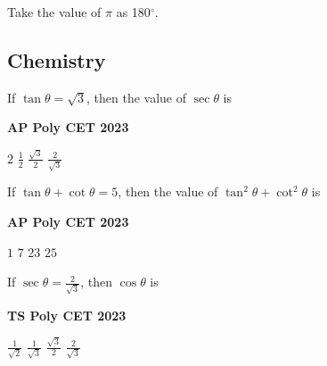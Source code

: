 \documentclass[11pt,paper=a4,answers]{exam}
\begin{document}
\begin{center}
\Large{Take the value of $\pi$ as 180${^\circ}$.}
\end{center}

\newpage















\subsection*{Chemistry}
\begin{multicols}{2}
\begin{questions}
\question
If $\tan  \theta = \sqrt{3}$, then the value of $\sec \theta$ is
\begin{flushright}
\small\textbf{AP Poly CET 2023}
\end{flushright}


\begin{choices}
\choice $\displaystyle 2$ 
\choice $\displaystyle \frac{1}{2}$ 
\choice $\displaystyle \frac{\sqrt{3}}{2}$ 
\choice $\displaystyle \frac{2}{\sqrt{3}}$  
\end{choices}






\question If $\tan  \theta + \cot \theta = 5$, then the value of $\tan^2  \theta + \cot^2 \theta $ is
\begin{flushright}
\small\textbf{AP Poly CET 2023}
\end{flushright}

\begin{choices}
\choice $\displaystyle 1$ 
\choice $\displaystyle 7$ 
\choice $\displaystyle 23$ 
\choice $\displaystyle 25$  
\end{choices}
\question If $\displaystyle \sec  \theta = \frac{2}{\sqrt{3}}$, then $\cos \theta$ is
\begin{flushright}
\small\textbf{TS Poly CET 2023}
\end{flushright}


\begin{choices}
\choice $\displaystyle \frac{1}{\sqrt{2}}$ 
\choice $\displaystyle \frac{1}{\sqrt{3}}$ 
\choice $\displaystyle \frac{\sqrt{3}}{2}$ 
\choice $\displaystyle \frac{2}{\sqrt{3}}$   
\end{choices}



\end{questions}
\end{multicols}
\end{document}
